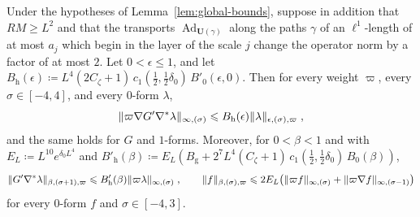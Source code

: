 \documentclass[11pt]{preprint}
\newcommand{\Ad}{\operatorname{Ad}}
\DeclarePairedDelimiter{\norm}{\lVert}{\rVert}
\numberwithin{equation}{section}
\begin{document}
\begin{lemma}\label{lem:global-holder}
Under the hypotheses of Lemma~\ref{lem:global-bounds}, suppose in addition that $RM \geqslant L^2$ and that the transports $\Ad_{\mathbf U(\gamma)}$ along the paths $\gamma$ of an $\ell^1$-length of at most $a_j$ which begin in the layer of the scale $j$ change the operator norm by a factor of at most $2$. Let $0 < \epsilon \leqslant 1$, and let $B_{\mathrm h}(\epsilon) \coloneqq L^4(2C_\zeta + 1)\,c_1(\frac{1}{2}, \frac{1}{2}\delta_0)\,B'_0(\epsilon, 0)$. Then for every weight $\varpi$, every $\sigma \in [-4, 4]$, and every $0$-form $\lambda$,
\begin{equation}\label{eq:global-holder}
    \norm{\varpi\nabla G'\nabla^*\lambda}_{\infty,(\sigma)} \leqslant B_{\mathrm h}(\epsilon)\norm\lambda_{\epsilon,(\sigma),\varpi}\;,
\end{equation}
and the same holds for $G$ and $1$-forms. Moreover, for $0 < \beta < 1$ and with $E_L \coloneqq L^{10}e^{\delta_0L^4}$ and $B'_{\mathrm h}(\beta) \coloneqq E_L(B_{\mathrm g} + 2^7L^4(C_\zeta + 1)\,c_1(\frac{1}{2}, \frac{1}{2}\delta_0)\,B_0(\beta))$,
\begin{equation}\label{eq:global-holder-first}
    \norm{G'\nabla^*\lambda}_{\beta,(\sigma+1),\varpi} \leqslant B'_{\mathrm h}(\beta)\norm{\varpi\lambda}_{\infty,(\sigma)}\;,
    \qquad
    \norm f_{\beta,(\sigma),\varpi} \leqslant 2E_L\bigl(\norm{\varpi f}_{\infty,(\sigma)} + \norm{\varpi\nabla f}_{\infty,(\sigma-1)}\bigr)
\end{equation}
for every $0$-form $f$ and $\sigma \in [-4, 3]$.
\end{lemma}
\end{document}
